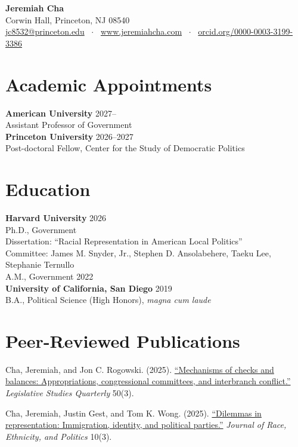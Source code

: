 \documentclass[11pt, letterpaper]{article}
\newcommand{\entry}[2]{\noindent #1 \hfill #2\\}
\newcommand{\subentry}[1]{\hspace*{1em}#1\\}
\newcommand{\subentrydate}[2]{\hspace*{1em}#1 \hfill #2\\}
\begin{document}
\begin{center}
    {\Huge\bfseries Jeremiah Cha}\\[1ex]
    Corwin Hall, Princeton, NJ 08540\\[0.5ex]
    \href{mailto:jc8532@princeton.edu}{jc8532@princeton.edu} ~$\cdot$~
    \href{https://www.jeremiahcha.com}{www.jeremiahcha.com} ~$\cdot$~
    \href{https://orcid.org/0000-0003-3199-3386}{orcid.org/0000-0003-3199-3386}
\end{center}

\vspace{1ex}

\section{Academic Appointments}
\entry{\textbf{American University}}{2027--}
\subentry{Assistant Professor of Government}

\entry{\textbf{Princeton University}}{2026--2027}
\subentry{Post-doctoral Fellow, Center for the Study of Democratic Politics}

\section{Education}

\entry{\textbf{Harvard University}}{2026}
\subentry{Ph.D., Government}
\subentry{\small Dissertation: ``Racial Representation in American Local Politics''}
\subentry{\small Committee: James M. Snyder, Jr., Stephen D. Ansolabehere, Taeku Lee, Stephanie Ternullo}
\subentrydate{A.M., Government}{2022}

\vspace{0.5ex}
\entry{\textbf{University of California, San Diego}}{2019}
\subentry{B.A., Political Science (High Honors), \textit{magna cum laude}}

\section{Peer-Reviewed Publications}

\begin{etaremune}
    \item Cha, Jeremiah, and Jon C. Rogowski. (2025). \href{https://onlinelibrary.wiley.com/doi/10.1111/lsq.70028}{``Mechanisms of checks and balances: Appropriations, congressional committees, and interbranch conflict.''} \emph{Legislative Studies Quarterly} 50(3).
    \item Cha, Jeremiah, Justin Gest, and Tom K. Wong. (2025). \href{https://www.cambridge.org/core/journals/journal-of-race-ethnicity-and-politics/article/abs/dilemmas-in-representation-immigration-identity-and-political-parties/212CAAFE1CD364A32E8C09B23832A0A0}{``Dilemmas in representation: Immigration, identity, and political parties.''} \emph{Journal of Race, Ethnicity, and Politics} 10(3).
\end{etaremune}
\end{document}
